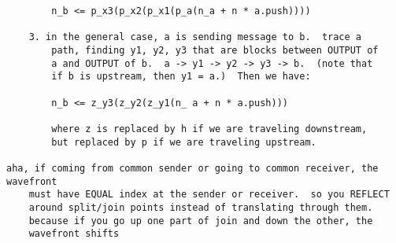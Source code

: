 \begin{verbatim}
		n_b <= p_x3(p_x2(p_x1(p_a(n_a + n * a.push))))

	3. in the general case, a is sending message to b.  trace a
		path, finding y1, y2, y3 that are blocks between OUTPUT of
		a and OUTPUT of b.  a -> y1 -> y2 -> y3 -> b.  (note that
		if b is upstream, then y1 = a.)  Then we have:

		n_b <= z_y3(z_y2(z_y1(n_ a + n * a.push)))

		where z is replaced by h if we are traveling downstream, 
		but replaced by p if we are traveling upstream.

aha, if coming from common sender or going to common receiver, the wavefront
	must have EQUAL index at the sender or receiver.  so you REFLECT
	around split/join points instead of translating through them.
	because if you go up one part of join and down the other, the
	wavefront shifts

\end{verbatim}



